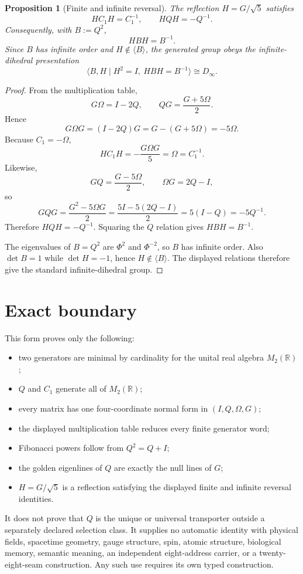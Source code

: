 \documentclass[11pt]{article}
\newtheorem{proposition}[theorem]{Proposition}
\theoremstyle{definition}
\newcommand{\R}{\mathbb R}
\begin{document}
\begin{proposition}[Finite and infinite reversal]
The reflection $H=G/\sqrt5$ satisfies
\[
\boxed{HC_1H=C_1^{-1}},\qquad
\boxed{HQH=-Q^{-1}}.
\]
Consequently, with $B:=Q^2$,
\[
HBH=B^{-1}.
\]
Since $B$ has infinite order and $H\notin\langle B\rangle$, the generated group obeys the infinite-dihedral presentation
\[
\langle B,H\mid H^2=I,\ HBH=B^{-1}\rangle\cong D_\infty.
\]
\end{proposition}

\begin{proof}
From the multiplication table,
\[
G\Omega=I-2Q,
\qquad
QG=\frac{G+5\Omega}{2}.
\]
Hence
\[
G\Omega G=(I-2Q)G
=G-(G+5\Omega)
=-5\Omega.
\]
Because $C_1=-\Omega$,
\[
HC_1H
=-\frac{G\Omega G}{5}
=\Omega=C_1^{-1}.
\]
Likewise,
\[
GQ=\frac{G-5\Omega}{2},\qquad \Omega G=2Q-I,
\]
so
\[
GQG
=\frac{G^2-5\Omega G}{2}
=\frac{5I-5(2Q-I)}{2}
=5(I-Q)
=-5Q^{-1}.
\]
Therefore $HQH=-Q^{-1}$. Squaring the $Q$ relation gives $HBH=B^{-1}$.

The eigenvalues of $B=Q^2$ are $\Phi^2$ and $\Phi^{-2}$, so $B$ has infinite order. Also $\det B=1$ while $\det H=-1$, hence $H\notin\langle B\rangle$. The displayed relations therefore give the standard infinite-dihedral group.\qedhere
\end{proof}

\section{Exact boundary}

This form proves only the following:
\begin{itemize}
\item two generators are minimal by cardinality for the unital real algebra $M_2(\R)$;
\item $Q$ and $C_1$ generate all of $M_2(\R)$;
\item every matrix has one four-coordinate normal form in $(I,Q,\Omega,G)$;
\item the displayed multiplication table reduces every finite generator word;
\item Fibonacci powers follow from $Q^2=Q+I$;
\item the golden eigenlines of $Q$ are exactly the null lines of $G$;
\item $H=G/\sqrt5$ is a reflection satisfying the displayed finite and infinite reversal identities.
\end{itemize}

It does not prove that $Q$ is the unique or universal transporter outside a separately declared selection class. It supplies no automatic identity with physical fields, spacetime geometry, gauge structure, spin, atomic structure, biological memory, semantic meaning, an independent eight-address carrier, or a twenty-eight-seam construction. Any such use requires its own typed construction.
\end{document}
